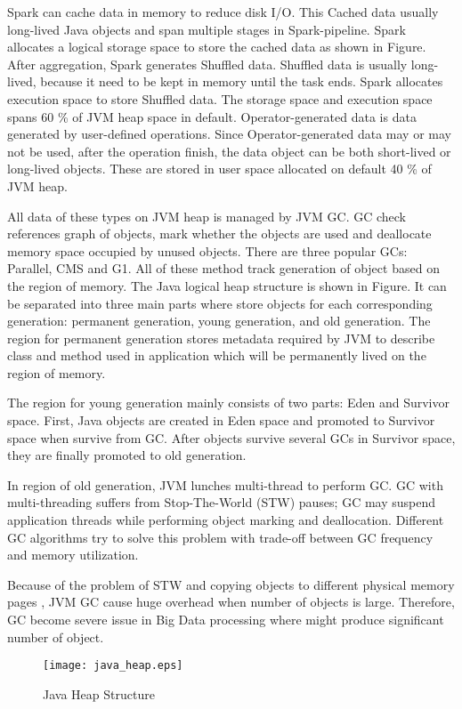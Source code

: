 Spark can cache data in memory to reduce disk I/O. This Cached data usually long-lived Java objects and span multiple stages in Spark-pipeline. 
Spark allocates a logical storage space to store the cached data as shown in Figure. After aggregation, Spark generates Shuffled data. Shuffled data is usually long-lived, 
because it need to be kept in memory until the task ends. Spark allocates execution space to store Shuffled data.
The storage space and execution space spans 60 \% of JVM heap space in default. Operator-generated data is data generated by user-defined operations. Since Operator-generated data may or may not be used, 
after the operation finish, the data object can be both short-lived or long-lived objects. These are stored in user space allocated on default 40 \% of JVM heap.

All data of these types on JVM heap is managed by JVM GC. GC check references graph of objects, mark whether the objects are used and deallocate memory space occupied by unused objects. 
There are three popular GCs: Parallel, CMS and G1. All of these method track generation of object based on the region of memory. 
The Java logical heap structure is shown in Figure. It can be separated into three main parts where store objects for each corresponding generation: 
permanent generation, young generation, and old generation. The region for permanent generation stores metadata required by JVM to describe 
class and method used in application which will be permanently lived on the region of memory. 

The region for young generation mainly consists of two parts: Eden and Survivor space. 
First, Java objects are created in Eden space and promoted to Survivor space when survive from GC. 
After objects survive several GCs in Survivor space, they are finally promoted to old generation.

In region of old generation, JVM lunches multi-thread to perform GC. GC with multi-threading suffers from Stop-The-World (STW) pauses; 
GC may suspend application threads while performing object marking and deallocation. 
Different GC algorithms try to solve this problem with trade-off between GC frequency and memory utilization. 

Because of the problem of STW and copying objects to different physical memory pages , JVM GC cause huge overhead when number of objects is large. 
Therefore, GC become severe issue in Big Data processing where might produce significant number of object.

\begin{figure}[htb]
    \texttt{[image: java\_heap.eps]}
    \caption{Java Heap Structure}
    \label{fig:Sampling}
\end{figure}

